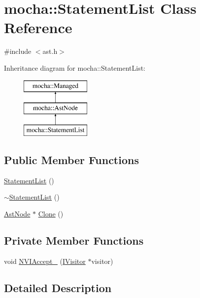 \hypertarget{classmocha_1_1_statement_list}{
\section{mocha::StatementList Class Reference}
\label{classmocha_1_1_statement_list}
}


{\ttfamily \#include $<$ast.h$>$}

Inheritance diagram for mocha::StatementList:\begin{figure}[H]
\begin{center}
\leavevmode
\includegraphics[height=3.000000cm]{classmocha_1_1_statement_list}
\end{center}
\end{figure}
\subsection*{Public Member Functions}
\begin{DoxyCompactItemize}
\item 
\hyperlink{classmocha_1_1_statement_list_a72954251ff4a53bb0ab9faddae2dd4ad}{StatementList} ()
\item 
\hyperlink{classmocha_1_1_statement_list_af08835cc9e76b71962334de0b27223d1}{$\sim$StatementList} ()
\item 
\hyperlink{classmocha_1_1_ast_node}{AstNode} $\ast$ \hyperlink{classmocha_1_1_statement_list_a7ff5ceab668e91d96a3f76a061990eeb}{Clone} ()
\end{DoxyCompactItemize}
\subsection*{Private Member Functions}
\begin{DoxyCompactItemize}
\item 
void \hyperlink{classmocha_1_1_statement_list_a08b4435f18aa7cc63e70ea435d9e11a6}{NVIAccept\_\-} (\hyperlink{classmocha_1_1_i_visitor}{IVisitor} $\ast$visitor)
\end{DoxyCompactItemize}


\subsection{Detailed Description}


